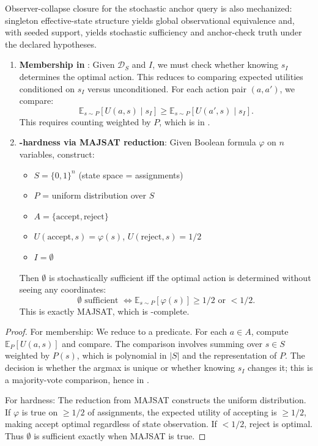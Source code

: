 
Observer-collapse closure for the stochastic anchor query is also mechanized: singleton effective-state structure yields global observational equivalence and, with seeded support, yields stochastic sufficiency and anchor-check truth under the declared hypotheses.

\begin{enumerate}
\item \textbf{Membership in \PP}: Given $\mathcal{D}_S$ and $I$, we must check whether knowing $s_I$ determines the optimal action. This reduces to comparing expected utilities conditioned on $s_I$ versus unconditioned. For each action pair $(a, a')$, we compare:
\[
\mathbb{E}_{s \sim P}[U(a,s) \mid s_I] \geq \mathbb{E}_{s \sim P}[U(a',s) \mid s_I].
\]
This requires counting weighted by $P$, which is in \PP.

\item \textbf{\PP-hardness via MAJSAT reduction}: Given Boolean formula $\varphi$ on $n$ variables, construct:
\begin{itemize}
\item $S = \{0,1\}^n$ (state space = assignments)
\item $P$ = uniform distribution over $S$
\item $A = \{\text{accept}, \text{reject}\}$
\item $U(\text{accept}, s) = \varphi(s)$, $U(\text{reject}, s) = 1/2$
\item $I = \emptyset$
\end{itemize}
Then $\emptyset$ is stochastically sufficient iff the optimal action is determined without seeing any coordinates:
\[
\emptyset \text{ sufficient } \iff \mathbb{E}_{s \sim P}[\varphi(s)] \geq 1/2 \text{ or } < 1/2.
\]
This is exactly MAJSAT, which is \PP-complete.
\end{enumerate}


\begin{proof}
For membership: We reduce to a \PP predicate. For each $a \in A$, compute $\mathbb{E}_P[U(a,s)]$ and compare. The comparison involves summing over $s \in S$ weighted by $P(s)$, which is polynomial in $|S|$ and the representation of $P$. The decision is whether the argmax is unique or whether knowing $s_I$ changes it; this is a majority-vote comparison, hence in \PP.

For hardness: The reduction from MAJSAT constructs the uniform distribution. If $\varphi$ is true on $\geq 1/2$ of assignments, the expected utility of accepting is $\geq 1/2$, making accept optimal regardless of state observation. If $< 1/2$, reject is optimal. Thus $\emptyset$ is sufficient exactly when MAJSAT is true.
\end{proof}

